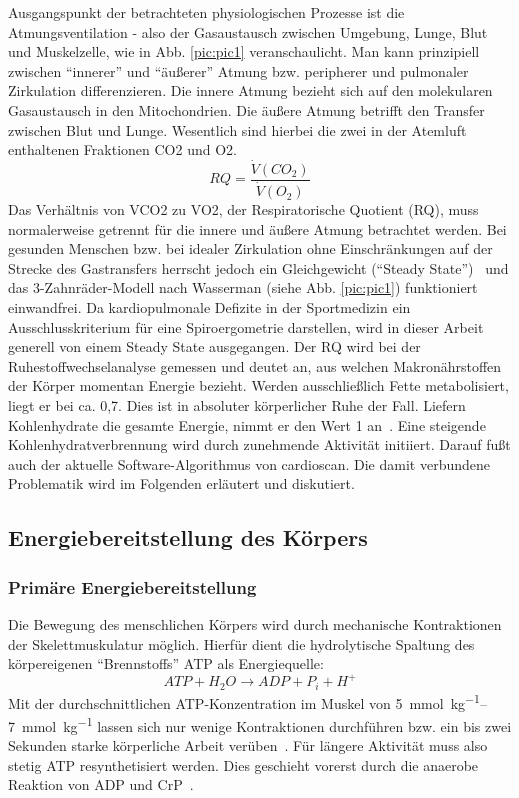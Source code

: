 Ausgangspunkt der betrachteten physiologischen Prozesse ist die Atmungsventilation - also der Gasaustausch zwischen Umgebung, Lunge, Blut und Muskelzelle, wie in Abb. \ref{pic:pic1} veranschaulicht. Man kann prinzipiell zwischen "`innerer"' und "`äußerer"' Atmung bzw. peripherer und pulmonaler Zirkulation differenzieren. Die innere Atmung bezieht sich auf den molekularen Gasaustausch in den Mitochondrien. Die äußere Atmung betrifft den Transfer zwischen Blut und Lunge. Wesentlich sind hierbei die zwei in der Atemluft enthaltenen Fraktionen \ac{CO2} und \ac{O2}.
%
\begin{equation}
RQ = \frac{\dot{V}(CO_2)}{\dot{V}(O_2)}
\label{eq:formel1}
\end{equation}
%
Das Verhältnis von \ac{VCO2} zu \ac{VO2}, der Respiratorische Quotient (\acs{RQ}), muss normalerweise getrennt für die innere und äußere Atmung betrachtet werden. Bei gesunden Menschen bzw. bei idealer Zirkulation ohne Einschränkungen auf der Strecke des Gastransfers herrscht jedoch ein Gleichgewicht ("`Steady State"')~\cite{Kroidl.2015} und das 3-Zahnräder-Modell nach Wasserman (siehe Abb. \ref{pic:pic1}) funktioniert einwandfrei. Da kardiopulmonale Defizite in der Sportmedizin ein Ausschlusskriterium für eine Spiroergometrie darstellen, wird in dieser Arbeit generell von einem Steady State ausgegangen. Der RQ wird bei der Ruhestoffwechselanalyse gemessen und deutet an, aus welchen Makronährstoffen der Körper momentan Energie bezieht. Werden ausschließlich Fette metabolisiert, liegt er bei ca. 0,7. Dies ist in absoluter körperlicher Ruhe der Fall. Liefern Kohlenhydrate die gesamte Energie, nimmt er den Wert 1 an~\cite{Kroidl.2015}. Eine steigende Kohlenhydratverbrennung wird durch zunehmende Aktivität initiiert. Darauf fußt auch der aktuelle Software-Algorithmus von cardioscan. Die damit verbundene Problematik wird im Folgenden erläutert und diskutiert.

\subsection{Energiebereitstellung des Körpers}

\subsubsection{Primäre Energiebereitstellung}

Die Bewegung des menschlichen Körpers wird durch mechanische Kontraktionen der Skelettmuskulatur möglich. Hierfür dient die hydrolytische Spaltung des körpereigenen "`Brennstoffs"' \ac{ATP} als Energiequelle:
%
\begin{equation}
ATP + H_2O \rightarrow ADP + P_i + H^+
\label{eq:formel2}
\end{equation}
%
Mit der durchschnittlichen ATP-Konzentration im Muskel von \SIrange{5}{7}{\milli\mole\per\kg} lassen sich nur wenige Kontraktionen durchführen bzw. ein bis zwei Sekunden starke körperliche Arbeit verüben~\cite{DeMarees.1981}. Für längere Aktivität muss also stetig ATP resynthetisiert werden. Dies geschieht vorerst durch die anaerobe Reaktion von \ac{ADP} und \ac{CrP}~\cite{Heck.2006}. 

